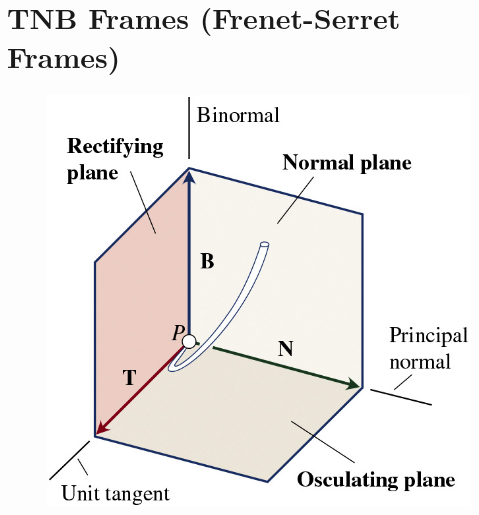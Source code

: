 \documentclass{article}
\begin{document}
\section{TNB Frames (Frenet-Serret Frames)}
\begin{figure}[h]
  \includegraphics[scale=1]{TNB}
  \centering
  \label{fig:TNB}
\end{figure}
\end{document}

